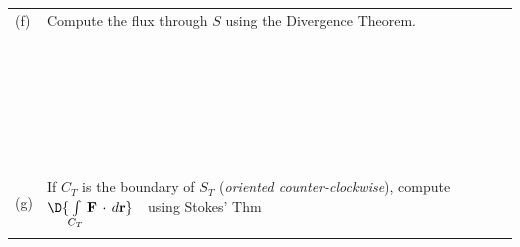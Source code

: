 \documentclass[12pt]{amsart}
\numberwithin{equation}{section}
\begin{document}
{{\setlength{\extrarowheight}{0.1cm}
\begin{tabular}{p{0.35cm}p{18.6cm}}
	(f) & Compute the flux through $S$ using the Divergence Theorem. \\
	&\\&\\&\\&\\&\\&\\&\\&\\&\\&\\&\\&\\&\\&\\&\\&\\&\\&\\&\\&\\&\\&\\&\\&\\&\\&\\&\\
	(g) & If $C_T$ is the boundary of $S_T$ ({\em oriented counter-clockwise}), compute \, $\D{\int \limits_{C_T} {\bf F}\,\cdot\, d{\bf r}}$ \,\, using Stokes' Thm \\
	&\\
\end{tabular}}

}
\end{document}
